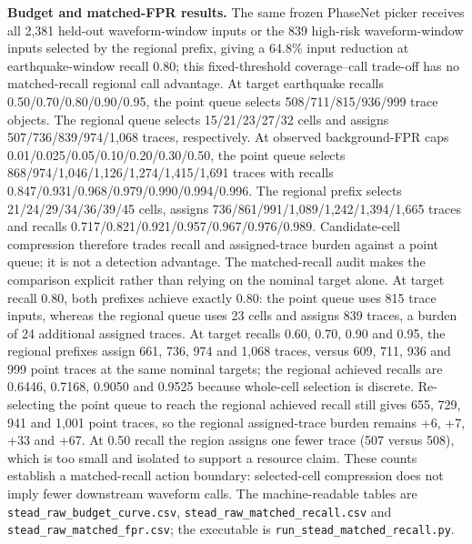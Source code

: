 \documentclass[11pt,a4paper]{article}
\numberwithin{equation}{section}
\theoremstyle{definition}\newtheorem{definition}[theorem]{Definition}
\theoremstyle{remark}\newtheorem{remark}[theorem]{Remark}
\begin{document}
\textbf{Budget and matched-FPR results.} The same frozen PhaseNet picker receives all 2,381 held-out waveform-window inputs or the 839 high-risk waveform-window inputs selected by the regional prefix, giving a 64.8\% input reduction at earthquake-window recall 0.80; this fixed-threshold coverage--call trade-off has no matched-recall regional call advantage. At target earthquake recalls 0.50/0.70/0.80/0.90/0.95, the point queue selects 508/711/815/936/999 trace objects. The regional queue selects 15/21/23/27/32 cells and assigns 507/736/839/974/1,068 traces, respectively. At observed background-FPR caps 0.01/0.025/0.05/0.10/0.20/0.30/0.50, the point queue selects 868/974/1,046/1,126/1,274/1,415/1,691 traces with recalls 0.847/0.931/0.968/0.979/0.990/0.994/0.996. The regional prefix selects 21/24/29/34/36/39/45 cells, assigns 736/861/991/1,089/1,242/1,394/1,665 traces and recalls 0.717/0.821/0.921/0.957/0.967/0.976/0.989. Candidate-cell compression therefore trades recall and assigned-trace burden against a point queue; it is not a detection advantage. The matched-recall audit makes the comparison explicit rather than relying on the nominal target alone. At target recall 0.80, both prefixes achieve exactly 0.80: the point queue uses 815 trace inputs, whereas the regional queue uses 23 cells and assigns 839 traces, a burden of 24 additional assigned traces. At target recalls 0.60, 0.70, 0.90 and 0.95, the regional prefixes assign 661, 736, 974 and 1,068 traces, versus 609, 711, 936 and 999 point traces at the same nominal targets; the regional achieved recalls are 0.6446, 0.7168, 0.9050 and 0.9525 because whole-cell selection is discrete. Re-selecting the point queue to reach the regional achieved recall still gives 655, 729, 941 and 1,001 point traces, so the regional assigned-trace burden remains +6, +7, +33 and +67. At 0.50 recall the region assigns one fewer trace (507 versus 508), which is too small and isolated to support a resource claim. These counts establish a matched-recall action boundary: selected-cell compression does not imply fewer downstream waveform calls. The machine-readable tables are \texttt{stead\_raw\_budget\_curve.csv}, \texttt{stead\_raw\_matched\_recall.csv} and \texttt{stead\_raw\_matched\_fpr.csv}; the executable is \texttt{run\_stead\_matched\_recall.py}.
\end{document}

